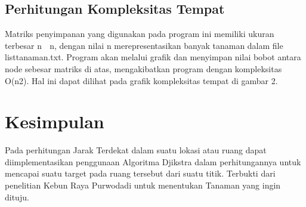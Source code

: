 \documentclass[conference]{IEEEtran}
\begin{document}

\subsection{Perhitungan Kompleksitas Tempat}
Matriks penyimpanan yang digunakan pada program ini
memiliki ukuran terbesar n  n, dengan nilai n merepresentasikan
banyak tanaman dalam file listtanaman.txt. Program
akan melalui grafik dan menyimpan nilai bobot antara node
sebesar matriks di atas, mengakibatkan program dengan kompleksitas
O(n2). Hal ini dapat dilihat pada grafik kompleksitas
tempat di gambar 2.


\section{Kesimpulan}
Pada perhitungan Jarak Terdekat dalam suatu lokasi atau ruang
dapat diimplementasikan penggunaan Algoritma Djikstra
dalam perhitungannya untuk mencapai suatu target pada ruang
tersebut dari suatu titik. Terbukti dari penelitian Kebun Raya
Purwodadi untuk menentukan Tanaman yang ingin dituju.



\end{document}
